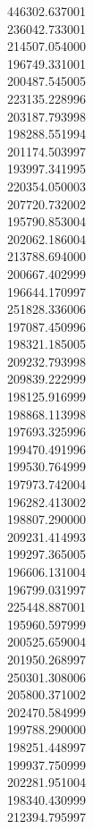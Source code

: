 446302.637001\\
236042.733001\\
214507.054000\\
196749.331001\\
200487.545005\\
223135.228996\\
203187.793998\\
198288.551994\\
201174.503997\\
193997.341995\\
220354.050003\\
207720.732002\\
195790.853004\\
202062.186004\\
213788.694000\\
200667.402999\\
196644.170997\\
251828.336006\\
197087.450996\\
198321.185005\\
209232.793998\\
209839.222999\\
198125.916999\\
198868.113998\\
197693.325996\\
199470.491996\\
199530.764999\\
197973.742004\\
196282.413002\\
198807.290000\\
209231.414993\\
199297.365005\\
196606.131004\\
196799.031997\\
225448.887001\\
195960.597999\\
200525.659004\\
201950.268997\\
250301.308006\\
205800.371002\\
202470.584999\\
199788.290000\\
198251.448997\\
199937.750999\\
202281.951004\\
198340.430999\\
212394.795997\\
